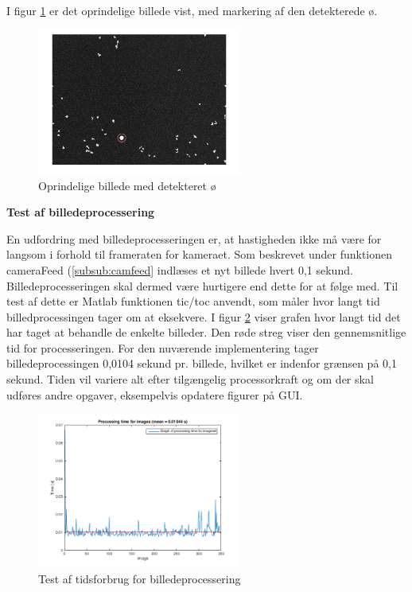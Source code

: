 I figur \ref{fig:finalimage} er det oprindelige billede vist, med markering af den detekterede ø.


\begin{figure}[H]
	\centering
	\includegraphics[width=0.6\textwidth]{billeder/software/finalimage.png}
	\caption{Oprindelige billede med detekteret ø}
	\label{fig:finalimage}
\end{figure}

\newpage
\textbf{Test af billedeprocessering}

En udfordring med billedeprocesseringen er, at hastigheden ikke må være for langsom i forhold til frameraten for kameraet. Som beskrevet under funktionen cameraFeed (\ref{subsub:camfeed} indlæses et nyt billede hvert 0,1 sekund. Billedeprocesseringen skal dermed være hurtigere end dette for at følge med. Til test af dette er Matlab funktionen tic/toc anvendt, som måler hvor langt tid billedprocessingen tager om at eksekvere. I figur \ref{fig:dataprocess} viser grafen hvor langt tid det har taget at behandle de enkelte billeder. Den røde streg viser den gennemsnitlige tid for processeringen. For den nuværende implementering tager billedeprocessingen 0,0104 sekund pr. billede, hvilket er indenfor grænsen på 0,1 sekund. Tiden vil variere alt efter tilgængelig processorkraft og om der skal udføres andre opgaver, eksempelvis opdatere figurer på GUI. 

\begin{figure}[H]
	\centering
	\includegraphics[width=0.6\textwidth]{billeder/software/dataprocessing_2.png}
	\caption{Test af tidsforbrug for billedeprocessering}
	\label{fig:dataprocess}
\end{figure}

